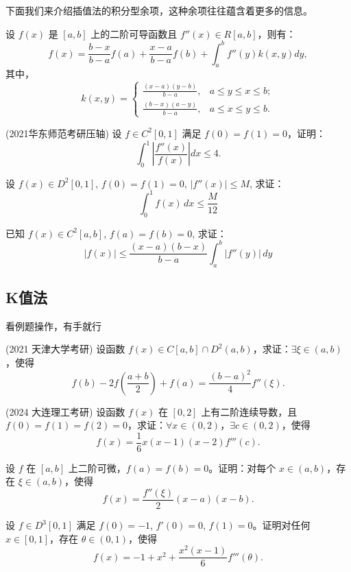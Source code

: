 \documentclass[lang=cn,10pt,thmcnt=section]{elegantbook}
\begin{document}
下面我们来介绍插值法的积分型余项，这种余项往往蕴含着更多的信息。
\begin{theorem}[积分型余项]
	设 \( f(x) \) 是 \([a,b]\) 上的二阶可导函数且 \( f''(x) \in R[a,b] \)，则有：
\[ f(x) = \frac{b-x}{b-a}f(a) + \frac{x-a}{b-a}f(b) + \int_a^b f''(y)k(x,y)dy, \]
其中，
\[ k(x,y) = 
\begin{cases} 
\frac{(x-a)(y-b)}{b-a}, & a \leq y \leq x \leq b; \\ 
\frac{(b-x)(a-y)}{b-a}, & a \leq x \leq y \leq b.
\end{cases} \]
\end{theorem}
\begin{example}
	(2021华东师范考研压轴) 设 \( f \in C^2[0,1] \) 满足 \( f(0) = f(1) = 0 \)，证明：
\[ \int_0^1 \left| \frac{f''(x)}{f(x)} \right| dx \leq 4. \]
\end{example}
\begin{example}
	设 \( f(x) \in D^2[0, 1] \), \( f(0) = f(1) = 0 \), \( |f''(x)| \leq M \), 求证：
    \[ \int_{0}^{1} f(x) \, dx \leq \frac{M}{12} \]
    
\end{example}
\begin{example}
	已知 \( f(x) \in C^2[a, b] \), \( f(a) = f(b) = 0 \), 求证：
    \[ |f(x)| \leq \frac{(x - a)(b - x)}{b - a} \int_{a}^{b} |f''(y)| \, dy \]
\end{example}
\subsection{K值法}
看例题操作，有手就行
\begin{example}
	(2021 天津大学考研) 设函数 \( f(x) \in C[a,b] \cap D^2(a,b) \)，求证：\(\exists \xi \in (a,b)\)，使得
\[ f(b) - 2f\left(\frac{a+b}{2}\right) + f(a) = \frac{(b-a)^2}{4}f''(\xi). \]
\end{example}
\begin{example}
	(2024 大连理工考研) 设函数 \( f(x) \) 在 \([0,2]\) 上有二阶连续导数，且 \( f(0) = f(1) = f(2) = 0 \)，求证：\(\forall x \in (0,2)\)，\(\exists c \in (0,2)\)，使得
\[ f(x) = \frac{1}{6}x(x-1)(x-2)f'''(c). \]
\end{example}
\begin{example}
	设 $f$ 在 $[a,b]$ 上二阶可微，$f(a) = f(b) = 0$。证明：对每个 $x \in (a,b)$，存在 $\xi \in (a,b)$，使得
    \[ f(x) = \frac{f''(\xi)}{2}(x-a)(x-b). \]
\end{example}
\begin{example}
	设 $f \in D^3[0,1]$ 满足 $f(0) = -1$, $f'(0) = 0$, $f(1) = 0$。证明对任何 $x \in [0,1]$，存在 $\theta \in (0,1)$，使得
    \[ f(x) = -1 + x^2 + \frac{x^2(x-1)}{6}f'''(\theta). \]
\end{example}
\end{document}
